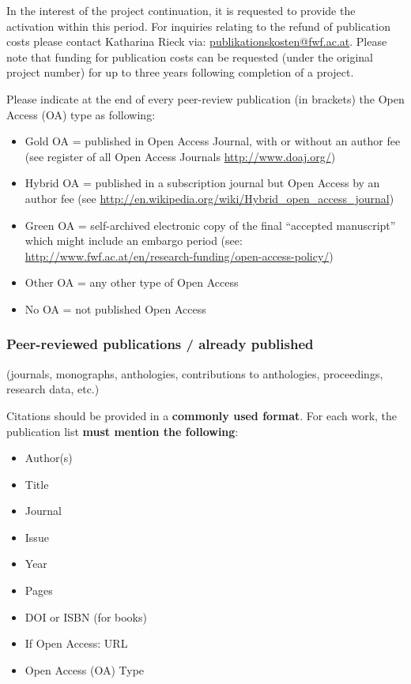 \documentclass[a4paper, 11pt]{article}
\begin{document}
In the interest of the project continuation, it is requested to provide the activation 
within this period. For inquiries relating to the refund of publication costs please contact
Katharina Rieck via: \url{publikationskosten@fwf.ac.at}. Please note that funding for publication
costs can be requested (under the original project number) for up to three years following
completion of a project.

Please indicate at the end of every peer-review publication (in brackets) the
Open Access (OA) type as following: 

\begin{itemize}
\item Gold OA = published in Open Access Journal, with or without an author fee (see
register of all Open Access Journals \url{http://www.doaj.org/})
\item Hybrid OA = published in a subscription journal but Open Access by an author fee
(see \url{http://en.wikipedia.org/wiki/Hybrid\_open\_access\_journal}) 
\item Green OA = self-archived electronic copy of the final ``accepted manuscript''
which might include an embargo period (see:\\
\url{http://www.fwf.ac.at/en/research-funding/open-access-policy/})
\item Other OA = any other type of Open Access
\item No OA = not published Open Access 
\end{itemize}

\subsubsection{Peer-reviewed publications / already published}
(journals, monographs, anthologies, contributions to anthologies, proceedings,
research data, etc.)

Citations should be provided in a \textbf{commonly used format}. For each work, the
publication list \textbf{must mention the following}:

\begin{itemize}
\item Author(s)
\item Title
\item Journal
\item Issue
\item Year
\item Pages
\item DOI or ISBN (for books)
\item If Open Access: URL
\item Open Access (OA) Type
\end{itemize}
\end{document}
